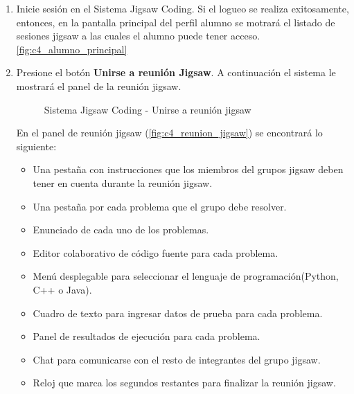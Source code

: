 \begin{enumerate}
	\item Inicie sesión en el Sistema Jigsaw Coding. Si el logueo se realiza exitosamente, entonces, en la pantalla principal del perfil alumno se motrará el listado de sesiones jigsaw a las cuales el alumno puede tener acceso.\autoref{fig:c4_alumno_principal}
	\item Presione el botón \textbf{Unirse a reunión Jigsaw}. A continuación el sistema le mostrará el panel de la reunión jigsaw. 
	
	\begin{figure}[h!]
		\centering
		\caption{Sistema Jigsaw Coding - Unirse a reunión jigsaw}
		\label{fig:c4_reunion_jigsaw}
	\end{figure}
	
	En el panel de reunión jigsaw  (\autoref{fig:c4_reunion_jigsaw}) se encontrará lo siguiente: 
	
	\begin{itemize}
		\item Una pestaña con instrucciones que los miembros del grupos jigsaw deben tener en cuenta durante la reunión jigsaw.
		\item Una pestaña por cada problema que el grupo debe resolver.
		\item Enunciado de cada uno de los problemas.
		\item Editor colaborativo de código fuente para cada problema.
		\item Menú desplegable para seleccionar el lenguaje de programación(Python, C++ o Java).
		\item Cuadro de texto para ingresar datos de prueba para cada problema.
		\item Panel de resultados de ejecución para cada problema.
		\item Chat para comunicarse con el resto de integrantes del grupo jigsaw.
		\item Reloj que marca los segundos restantes para finalizar la reunión jigsaw.
	\end{itemize}
\end{enumerate}

